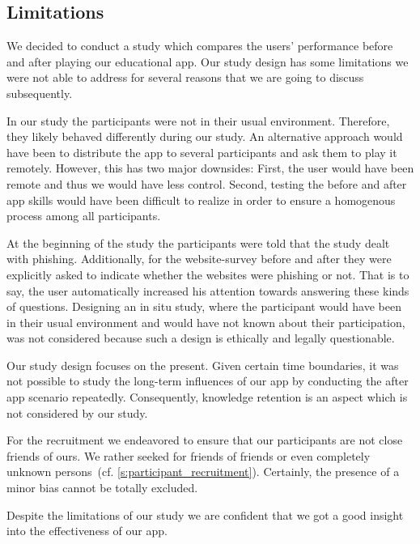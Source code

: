 \subsection{Limitations}
We decided to conduct a study which compares the users' performance before and after playing our educational app.
Our study design has some limitations we were not able to address for several reasons that we are going to discuss subsequently.

\begin{description}[leftmargin=0cm]
	\item[Behavior Change:] In our study the participants were not in their usual environment. 
	Therefore, they likely behaved differently during our study.
	An alternative approach would have been to distribute the app to several participants and ask them to play it remotely.
	However, this has two major downsides: First, the user would have been remote and thus we would have less control.
	Second, testing the before and after app skills would have been difficult to realize in order to ensure a homogenous process among all participants.
	\item[Increased Attention:] At the beginning of the study the participants were told that the study dealt with phishing.
	Additionally, for the website-survey before and after they were explicitly asked to indicate whether the websites were phishing or not.
	That is to say, the user automatically increased his attention towards answering these kinds of questions.
	Designing an in situ study, where the participant would have been in their usual environment and would have not known about their participation, was not considered because such a design is ethically and legally questionable. 
	\item[Knowledge Retention:] Our study design focuses on the present.
	Given certain time boundaries, it was not possible to study the long-term influences of our app by conducting the after app scenario repeatedly. 
	Consequently, knowledge retention is an aspect which is not considered by our study.
	\item[Bias:] For the recruitment we endeavored to ensure that our participants are not close friends of ours. 
	We rather seeked for friends of friends or even completely unknown persons~(cf. \autoref{s:participant_recruitment}).
	Certainly, the presence of a minor bias cannot be totally excluded.
\end{description}
Despite the limitations of our study we are confident that we got a good insight into the effectiveness of our app.


